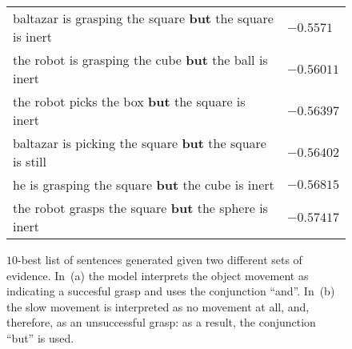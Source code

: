\begin{figure*}
{{\begin{tabular}{ll}
        baltazar is grasping the square \textbf{but} the square is inert  & $-0.5571$ \\
        the robot is grasping the cube \textbf{but} the ball is inert  & $-0.56011$ \\
        the robot picks the box \textbf{but} the square is inert  & $-0.56397$ \\
        baltazar is picking the square \textbf{but} the square is still  & $-0.56402$ \\
        he is grasping the square \textbf{but} the cube is inert  & $-0.56815$ \\
        the robot grasps the square \textbf{but} the sphere is inert  & $-0.57417$ \\
        \bottomrule
      \end{tabular}%
    } %
    \label{tab:conjunction:but}
  } %
%
    \caption{$10$-best list of sentences generated given two different sets of evidence.
    In~(a) the model interprets the object movement as indicating a succesful grasp and uses the conjunction ``and''.
    In~(b) the slow movement is interpreted as no movement at all, and, therefore, as an unsuccessful grasp: as a result, the conjunction ``but'' is used.}
    \label{tab:conjunction}
\end{figure*}


%



